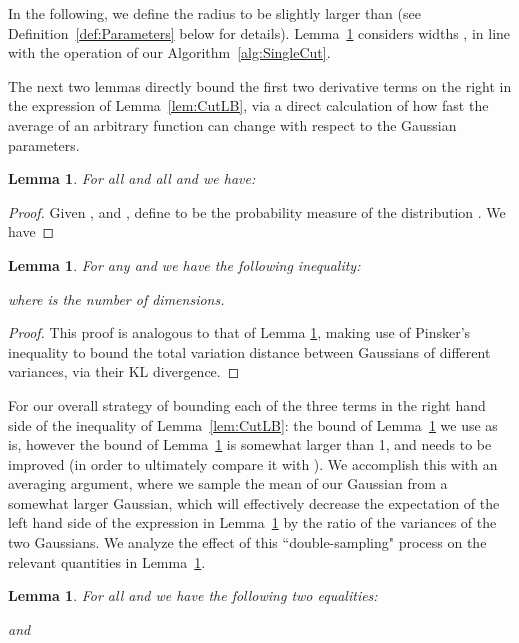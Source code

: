 \documentclass[11pt,letter]{article}
\newcounter{nTheorems}
\numberwithin{nTheorems}{section}
\newtheorem{lemma}[nTheorems]{Lemma}
\begin{document}
In the following, we define the radius  to be slightly larger than  (see Definition~\ref{def:Parameters} below for details).
Lemma~\ref{lem:MovingInThinDimension} considers widths , in line with the operation of our Algorithm~\ref{alg:SingleCut}.

The next two lemmas directly bound the first two derivative terms on the right in the expression of Lemma~\ref{lem:CutLB}, via a direct calculation of how fast the average of an arbitrary function can change with respect to the Gaussian parameters.

\begin{lemma}
\label{lem:MovingInThinDimension}
For all  and all  and  we have:

\end{lemma}

\begin{proof}
Given ,  and , define  to be the probability measure of the distribution . We have

\end{proof}

\begin{lemma}
\label{lem:Isoperimetric}
For any  and  we have the following inequality:

where  is the number of  dimensions.
\end{lemma}

\begin{proof}
This proof is analogous to that of Lemma \ref{lem:MovingInThinDimension}, making use of Pinsker's inequality to bound the total variation distance between Gaussians of different variances, via their KL divergence.
\end{proof}

For our overall strategy of bounding each of the three terms in the right hand side of the inequality of Lemma~\ref{lem:CutLB}: the bound of Lemma~\ref{lem:MovingInThinDimension} we use as is, however the bound of Lemma~\ref{lem:Isoperimetric} is somewhat larger than 1, and needs to be improved (in order to ultimately compare it with ). We accomplish this with an averaging argument, where we sample the mean of our Gaussian from a somewhat larger Gaussian, which will effectively decrease the expectation of the left hand side of the expression in Lemma~\ref{lem:Isoperimetric} by the ratio of the variances of the two Gaussians. We analyze the effect of this ``double-sampling" process on the relevant quantities in Lemma~\ref{lem:DoubleSampling}.
\begin{lemma}
\label{lem:DoubleSampling}
For all  and  we have the following two equalities:

and
\end{lemma}
\end{document}
